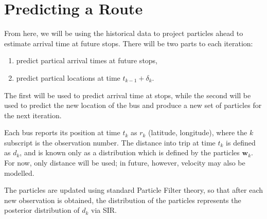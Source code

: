 \documentclass[11pt]{article}\usepackage[]{graphicx}\usepackage[]{color}
\newcommand{\bw}{\boldsymbol{w}}
\begin{document}
\section{Predicting a Route}
\label{sec:route_prediction}

From here, we will be using the historical data to project particles ahead to estimate arrival time at future stops.
There will be two parts to each iteration:
\begin{enumerate}
\item predict partical arrival times at future stops,
  
\item predict partical locations at time $t_{k-1} + \delta_k$.
\end{enumerate}
The first will be used to predict arrival time at stops, 
while the second will be used to predict the new location of the bus and produce a new set of particles for the next iteration.


Each bus reports its position at time $t_k$ as $r_k$ (latitude, longitude), 
where the $k$ subscript is the observation number.
The distance into trip at time $t_k$ is defined as $d_k$, 
and is known only as a distribution which is defined by the particles $\bw_k$.
For now, only distance will be used; in future, however, velocity may also be modelled.


The particles are updated using standard Particle Filter theory, 
so that after each new observation is obtained, 
the distribution of the particles represents the posterior distribution of $d_k$ via SIR.
\end{document}
